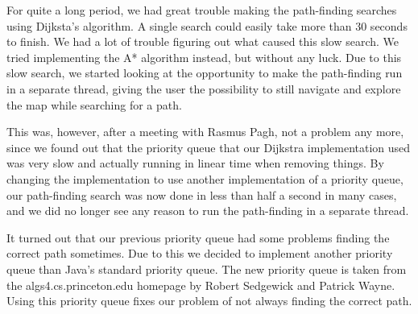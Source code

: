 For quite a long period, we had great trouble making the path-finding searches using Dijksta's algorithm. A single search could easily take more than 30 seconds to finish. We had a lot of trouble figuring out what caused this slow search. We tried implementing the A* algorithm instead, but without any luck. Due to this slow search, we started looking at the opportunity to make the path-finding run in a separate thread, giving the user the possibility to still navigate and explore the map while searching for a path. 

This was, however, after a meeting with Rasmus Pagh, not a problem any more, since we found out that the priority queue that our Dijkstra implementation used was very slow and actually running in linear time when removing things. By changing the implementation to use another implementation of a priority queue, our path-finding search was now done in less than half a second in many cases, and we did no longer see any reason to run the path-finding in a separate thread.

It turned out that our previous priority queue had some problems finding the correct path sometimes. Due to this we decided to implement another priority queue than Java's standard priority queue. The new priority queue is taken from the algs4.cs.princeton.edu homepage by Robert Sedgewick and Patrick Wayne. Using this priority queue fixes our problem of not always finding the correct path.
